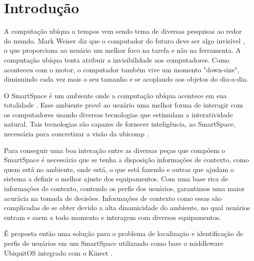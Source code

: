 \textual

\chapter{Introdução}
	
A computação ubíqua a tempos vem sendo tema de diversas pesquisas ao redor do mundo. Mark Weiser diz que o computador do futuro deve ser algo invisível \cite{weiser1} \cite{weiser2}, o que proporciona ao usuário um melhor foco na tarefa e não na ferramenta. A computação ubíqua tenta atribuir a invisibilidade aos computadores. Como aconteceu com o motor, o computador também vive um momento "down-size", diminuindo cada vez mais o seu tamanho e se acoplando aos objetos do dia-a-dia.

O SmartSpace é um ambiente onde a computação ubíqua acontece em sua totalidade \cite{gregoryabowd}. Esse ambiente provê ao usuário uma melhor forma de interagir com os computadores usando diversas tecnologias que estimulam a interatividade natural. Tais tecnologias são capazes de fornecer inteligência, ao SmartSpace, necessária para concretizar a visão da ubicomp \cite{fabriciobuzzeto}.

Para conseguir uma boa interação entre as diversas peças que compõem o SmartSpace é necessário que se tenha a disposição informações de contexto,  como quem está no ambiente, onde está, o que está fazendo e outras que ajudam o sistema a definir o melhor ajuste dos equipamentos. Com uma base rica de informações de contexto, contendo os perfis dos usuários, garantimos uma maior acurácia na tomada de decisões. Informações de contexto como essas são complicadas de se obter devido a alta dinamicidade do ambiente, no qual usuários entram e saem a todo momento e interagem com diversos equipamentos.

É proposta então uma solução para o problema de localização e identificação de perfis de usuários em um SmartSpace utilizando como base o middleware UbiquitOS \cite{alegomes} integrado com o Kinect \cite{kinecturl}.

